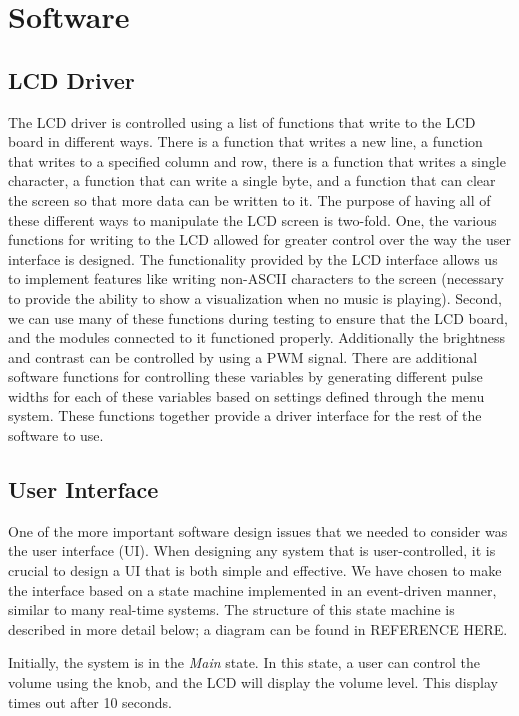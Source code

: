 \chapter{Software}

\section{LCD Driver}
The LCD driver is controlled using a list of functions that write to the LCD board in different ways. There is a function that writes a new line, a function that writes to a specified column and row, there is a function that writes a single character, a function that can write a single byte, and a function that can clear the screen so that more data can be written to it. The purpose of having all of these different ways to manipulate the LCD screen is two-fold. One, the various functions for writing to the LCD allowed for greater control over the way the user interface is designed. The functionality provided by the LCD interface allows us to implement features like writing non-ASCII characters to the screen (necessary to provide the ability to show a visualization when no music is playing). Second, we can use many of these functions during testing to ensure that the LCD board, and the modules connected to it functioned properly. Additionally the brightness and contrast can be controlled by using a PWM signal. There are additional software functions for controlling these variables by generating different pulse widths for each of these variables based on settings defined through the menu system. These functions together provide a driver interface for the rest of the software to use.
\section{User Interface}
\label{sec:ui}

One of the more important software design issues that we needed to consider was the user interface (UI). When designing any system that is user-controlled, it is crucial to design a UI that is both simple and effective. We have chosen to make the interface based on a state machine implemented in an event-driven manner, similar to many real-time systems. The structure of this state machine is described in more detail below; a diagram can be found in REFERENCE HERE.

Initially, the system is in the \emph{Main} state. In this state, a user can control the volume using the knob, and the LCD will display the volume level. This display times out after 10 seconds.

